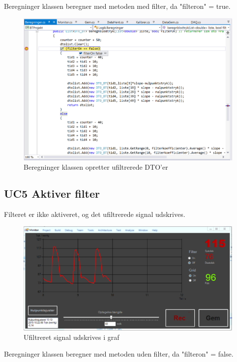 Beregninger klassen beregner med metoden med filter, da "filteron" = true.

\begin{figure}[H]
	\centering
	\includegraphics[width=1\textwidth]{Figurer/Test_Deaktiver_4}
	\caption{Beregninger klassen opretter ufiltrerede DTO'er}
\end{figure}

\subsection{UC5 Aktiver filter}

Filteret er ikke aktiveret, og det ufiltrerede signal udskrives.

\begin{figure}[H]
	\centering
	\includegraphics[width=1\textwidth]{Figurer/Test_Aktiver_1}
	\caption{Ufiltreret signal udskrives i graf}
\end{figure}

Beregninger klassen beregner med metoden uden filter, da "filteron" = false.

